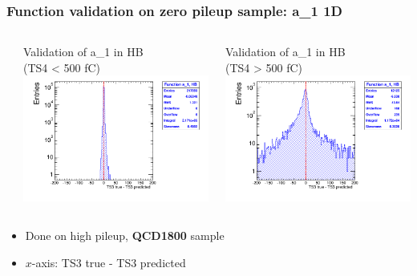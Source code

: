 \documentclass[bigger]{beamer}
\providecommand{\alert}[1]{\textbf{#1}}
\begin{document}
\begin{frame}
\frametitle{Function validation on zero pileup sample: a\_1 1D}
\label{sec-3-2-5}
\begin{columns} %
\label{sec-3-2-5-1}
\begin{column}{0.55\textwidth}
\label{sec-3-2-5-1-1}

\centering
Validation of a\_1 in HB \\ (TS4 < 500 fC)
\includegraphics[width=\textwidth]{fig/crosscheck_1D_sample1800_a0_under500_ring0.png}
\end{column}
\begin{column}{0.55\textwidth}
\label{sec-3-2-5-1-2}

\centering
Validation of a\_1 in HB \\ (TS4 > 500 fC)
\includegraphics[width=\textwidth]{fig/crosscheck_1D_sample1800_a0_over500_ring0.png}
\end{column}
\end{columns}
\label{sec-3-2-5-2}
\begin{itemize}

\item Done on high pileup, \alert{QCD1800} sample
\label{sec-3-2-5-2-1}%

\item $x$-axis: TS3 true - TS3 predicted
\label{sec-3-2-5-2-2}%
\end{itemize} %
\end{frame}
\end{document}
